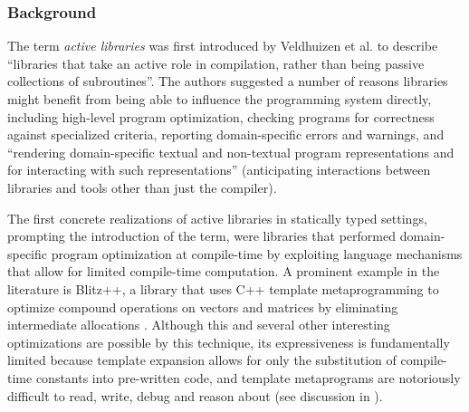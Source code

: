 \subsubsection{Background}\label{alibs}\label{background}
The term \emph{active libraries} was first introduced by Veldhuizen et al. \cite{activelibraries, active-libraries-thesis} to describe ``libraries that take an active role in compilation, rather than being passive collections of subroutines''. The authors suggested a number of reasons libraries might benefit from being able to influence the programming system directly, including high-level program optimization, checking programs for correctness against specialized criteria, reporting domain-specific errors and warnings, and ``rendering domain-specific textual and non-textual program representations and for interacting with such representations'' (anticipating interactions between libraries and tools other than just the compiler). 

The first concrete realizations of active libraries in statically typed settings, prompting the introduction of the term, were libraries that performed domain-specific program optimization at compile-time by exploiting language mechanisms that allow for limited compile-time computation. A prominent example in the literature is Blitz++, a library that uses C++ template metaprogramming to optimize compound operations on vectors and matrices by eliminating intermediate allocations \cite{veldhuizen2000blitz++}. Although this and several other interesting optimizations are possible by this technique, its expressiveness is fundamentally limited because template expansion allows for only the substitution of compile-time constants into pre-written code, and template metaprograms are notoriously difficult to read, write, debug and reason about (see discussion in \cite{Robison:2001:IEC:376656.376751}). %

